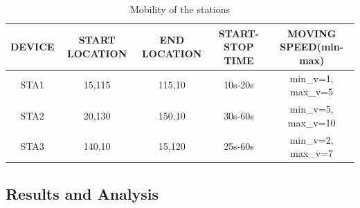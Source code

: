\documentclass{article}
\begin{document}
    	\begin{table}[h]
       		\begin{tabular}{|c|c|c|c|c|}
        			\hline
        			DEVICE & START LOCATION & END LOCATION & START-STOP TIME & MOVING SPEED(min-max)  \\
        			\hline
        			STA1 & 15,115 & 115,10 & 10s-20s & min\_v=1, max\_v=5 \\
        			STA2 & 20,130 & 150,10 & 30s-60s & min\_v=5, max\_v=10 \\
        			STA3 & 140,10 & 15,120 & 25s-60s & min\_v=2, max\_v=7 \\
        			\hline
        		\end{tabular}
        \caption{Mobility of the stations}
        \label{tab:2}
    	\end{table}
\subsection{Results and Analysis}
\end{document}
